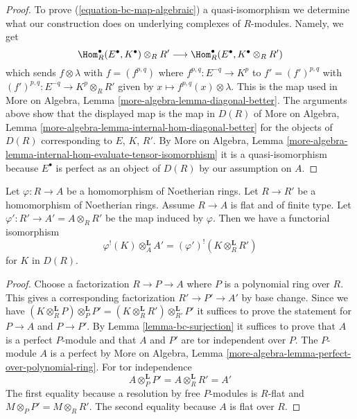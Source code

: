 \begin{proof}
\medskip\noindent
To prove (\ref{equation-bc-map-algebraic}) a quasi-isomorphism we determine
what our construction does on underlying complexes of $R$-modules.
Namely, we get
$$
\Hom^\bullet_R(E^\bullet, K^\bullet) \otimes_R R'
\longrightarrow
\Hom^\bullet_R(E^\bullet, K^\bullet \otimes_R R')
$$
which sends $f \otimes \lambda$ with $f = (f^{p, q})$
where $f^{p, q} : E^{-q} \to K^p$ to
$f' = (f')^{p, q}$ with $(f')^{p, q} : E^{-q} \to K^p \otimes_R R'$
given by $x \mapsto f^{p, q}(x) \otimes \lambda$.
This is the map used in
More on Algebra, Lemma \ref{more-algebra-lemma-diagonal-better}.
The arguments above show that the displayed map is
the map in $D(R)$ of
More on Algebra, Lemma \ref{more-algebra-lemma-internal-hom-diagonal-better}
for the objects of $D(R)$ corresponding to $E$, $K$, $R'$.
By More on Algebra, Lemma
\ref{more-algebra-lemma-internal-hom-evaluate-tensor-isomorphism}
it is a quasi-isomorphism because $E^\bullet$ is perfect as an object
of $D(R)$ by our assumption on $A$.
\end{proof}

\begin{lemma}
\label{lemma-bc}
Let $\varphi : R \to A$ be a homomorphism of Noetherian rings.
Let $R \to R'$ be a homomorphism of Noetherian rings. Assume
$R \to A$ is flat and of finite type.
Let $\varphi' : R' \to A' = A \otimes_R R'$ be the map induced by $\varphi$.
Then we have a functorial isomorphism
$$
\varphi^!(K) \otimes_A^\mathbf{L} A' =
(\varphi')^!(K \otimes_R^\mathbf{L} R')
$$
for $K$ in $D(R)$.
\end{lemma}

\begin{proof}
Choose a factorization $R \to P \to A$ where $P$ is a polynomial
ring over $R$. This gives a corresponding factorization
$R' \to P' \to A'$ by base change. Since we have
$(K \otimes_R^\mathbf{L} P) \otimes_P^\mathbf{L} P' =
(K \otimes_R^\mathbf{L} R') \otimes_{R'}^\mathbf{L} P'$
it suffices to prove the statement for
$P \to A$ and $P \to P'$. By Lemma \ref{lemma-bc-surjection}
it suffices to prove that $A$ is a perfect $P$-module
and that $A$ and $P'$ are tor independent over $P$.
The $P$-module $A$ is a perfect by
More on Algebra, Lemma \ref{more-algebra-lemma-perfect-over-polynomial-ring}.
For tor independence
$$
A \otimes_P^\mathbf{L} P' = A \otimes_R^\mathbf{L} R' = A'
$$
The first equality because a resolution by free $P$-modules is $R$-flat
and $M \otimes_P P' = M \otimes_R R'$. The second equality because
$A$ is flat over $R$.
\end{proof}





